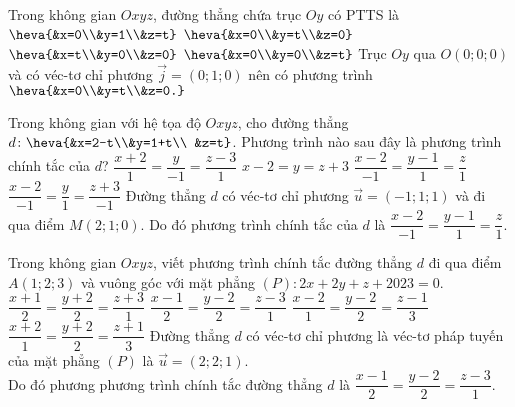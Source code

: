 \begin{ex}%
	Trong không gian $O x y z$, đường thẳng chứa trục $O y$ có PTTS là 
	\choice 
	{$\heva{&x=0\\&y=1\\&z=t}$}
		{\True $\heva{&x=0\\&y=t\\&z=0}$}
			{$\heva{&x=t\\&y=0\\&z=0}$}
				{$\heva{&x=0\\&y=0\\&z=t}$}
					\loigiai 
					{
		Trục $O y$ qua $O(0;0;0)$ và có véc-tơ chỉ phương $\vec{j}=(0;1;0)$ nên có phương trình $\heva{&x=0\\&y=t\\&z=0.}$
					}
\end{ex}

\begin{ex}%
	Trong không gian với hệ tọa độ $O x y z$, cho đường thẳng $d\colon\heva{&x=2-t\\&y=1+t\\ &z=t}$. Phương trình nào sau đây là phương trình chính tắc của $d$?
		\choice 
		{$\dfrac{x+2}{1}=\dfrac{y}{-1}=\dfrac{z-3}{1}$}
		{$x-2=y=z+3$}
		{\True $\dfrac{x-2}{-1}=\dfrac{y-1}{1}=\dfrac{z}{1}$}
		{$\dfrac{x-2}{-1}=\dfrac{y}{1}=\dfrac{z+3}{-1}$}
		\loigiai 
		{
Đường thẳng $d$ có véc-tơ chỉ phương $\vec{u}=(-1;1;1)$ và đi qua điểm $M(2;1;0)$. Do đó phương trình chính tắc của $d$ là $\dfrac{x-2}{-1}=\dfrac{y-1}{1}=\dfrac{z}{1}$.		
		}
\end{ex}

\begin{ex}%
	Trong không gian $O x y z$, viết phương trình chính tắc đường thẳng $d$ đi qua điểm $A(1;2;3)$ và vuông góc với mặt phẳng $(P)\colon 2x+2y+z+2023=0$.
	\choice 
	{$\dfrac{x+1}{2}=\dfrac{y+2}{2}=\dfrac{z+3}{1}$}
	{\True $\dfrac{x-1}{2}=\dfrac{y-2}{2}=\dfrac{z-3}{1}$}
	{$\dfrac{x-2}{1}=\dfrac{y-2}{2}=\dfrac{z-1}{3}$}
	{$\dfrac{x+2}{1}=\dfrac{y+2}{2}=\dfrac{z+1}{3}$}
	\loigiai 
	{
Đường thẳng $d$ có véc-tơ chỉ phương là véc-tơ pháp tuyến của mặt phẳng $(P)$ là $\vec{u}=(2;2;1)$.\\
Do đó phương phương trình chính tắc đường thẳng $d$ là $\dfrac{x-1}{2}=\dfrac{y-2}{2}=\dfrac{z-3}{1}$.
	}
\end{ex}

